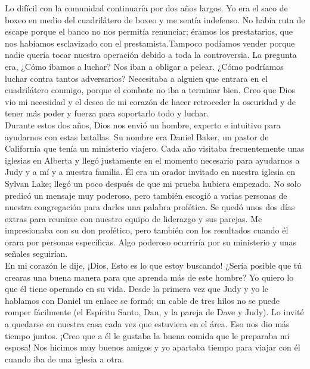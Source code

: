 \documentclass[twoside, 12pt]{book}
\begin{document}
Lo difícil con la comunidad continuaría por dos años largos. Yo era el saco de boxeo en medio del cuadrilátero de boxeo y me sentía indefenso.  No había ruta de escape porque el banco no nos permitía renunciar; éramos los prestatarios, que nos habíamos esclavizado con el prestamista.Tampoco podíamos vender porque nadie quería tocar nuestra operación debido a toda la controversia. La pregunta era, ¿Cómo íbamos a luchar?  Nos iban a obligar a pelear.  ¿Cómo podríamos luchar contra tantos adversarios? Necesitaba a alguien que entrara en el cuadrilátero conmigo, porque el combate no iba a terminar bien.  Creo que Dios vio mi necesidad y el deseo de mi corazón de hacer retroceder la oscuridad y de tener más poder y fuerza para soportarlo todo y luchar.\\

Durante estos dos años, Dios nos envió un hombre, experto e intuitivo para ayudarnos con estas batallas. Su nombre era Daniel Baker, un pastor de California que tenía un ministerio viajero. Cada año visitaba frecuentemente unas iglesias en Alberta y llegó justamente en el momento necesario para ayudarnos a Judy y a mí y a nuestra familia. Él era un orador invitado en nuestra iglesia en Sylvan Lake; llegó un poco después de que mi prueba hubiera empezado. No solo predicó un mensaje muy poderoso, pero también escogió a varias personas de nuestra congregación para darles una palabra profética. Se quedó unos dos días extras para reunirse con nuestro equipo de liderazgo y sus parejas. Me impresionaba con su don profético, pero también con los resultados cuando él orara por personas específicas. Algo poderoso ocurriría por su ministerio y unas señales seguirían.\\

En mi corazón le dije, ¡Dios, Esto es lo que estoy buscando! ¿Sería posible que tú crearas una buena manera para que aprenda más de este hombre? Yo quiero lo que él tiene operando en su vida.
Desde la primera vez que Judy y yo le hablamos con Daniel un enlace se formó; un cable de tres hilos no se puede romper fácilmente (el Espíritu Santo, Dan, y la pareja de Dave y Judy). Lo invité a quedarse en nuestra casa cada vez que estuviera en el área. Eso nos dio más tiempo juntos. ¡Creo que a él le gustaba la buena comida que le preparaba mi esposa! Nos hicimos muy buenos amigos y yo apartaba tiempo para viajar con él cuando iba de una iglesia a otra.\\
\end{document}
